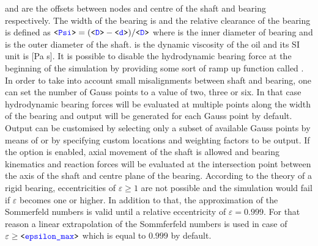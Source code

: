  and  are the offsets between nodes and centre of the shaft and bearing respectively. The width of the bearing is  and the relative clearance of the bearing is defined as $\texttt{<\textcolor{blue}{Psi}>}=(\texttt{<\textcolor{blue}{D}>} - \texttt{<\textcolor{blue}{d}>})/\texttt{<\textcolor{blue}{D}>}$ where  is the inner diameter of bearing and  is the outer diameter of the shaft.  is the dynamic viscosity of the oil and its SI unit is [Pa s]. It is possible to disable the hydrodynamic bearing force at the beginning of the simulation by providing some sort of ramp up function called . In order to take into account small misalignments between shaft and bearing, one can set the number of Gauss points  to a value of two, three or six. In that case hydrodynamic bearing forces will be evaluated at multiple points along the width of the bearing and output will be generated for each Gauss point by default. Output can be customised by selecting only a subset of available Gauss points by means of  or by specifying custom locations  and weighting factors  to be output. If the option  is enabled, axial movement of the shaft is allowed and bearing kinematics and reaction forces will be evaluated at the intersection point between the axis of the shaft and centre plane of the bearing. According to the theory of a rigid bearing, eccentricities of $\varepsilon \geq 1$ are not possible and the simulation would fail if $\varepsilon$ becomes one or higher. In addition to that, the approximation of the Sommerfeld numbers is valid until a relative eccentricity of $\varepsilon=0.999$. For that reason a linear extrapolation of the Sommferfeld numbers is used in case of $\varepsilon \geq \texttt{<\textcolor{blue}{epsilon\_max}>}$ which is equal to $0.999$ by default.
%
